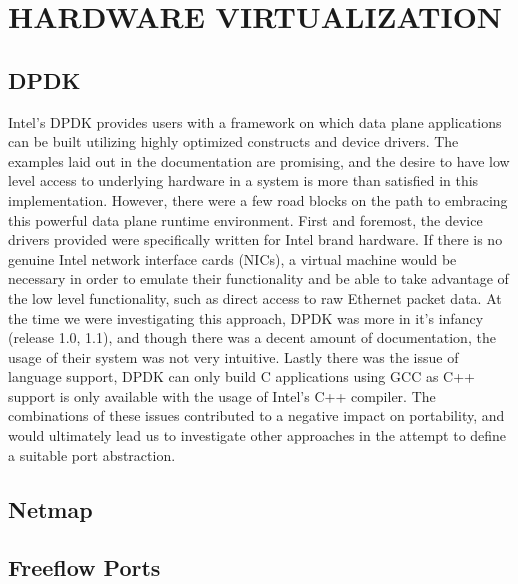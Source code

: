 \chapter{HARDWARE VIRTUALIZATION}
\label{hardware}


\section{DPDK}
\label{hardware:dpdk}
Intel's DPDK provides users with a framework on which data plane
applications can be built utilizing highly optimized constructs and
device drivers. The examples laid out in the documentation are
promising, and the desire to have low level access to underlying
hardware in a system is more than satisfied in this implementation.
However, there were a few road blocks on the path to embracing this
powerful data plane runtime environment. First and foremost, the
device drivers provided were specifically written for Intel brand
hardware. If there is no genuine Intel network interface cards
(NICs), a virtual machine would be necessary in order to emulate
their functionality and be able to take advantage of the low level
functionality, such as direct access to raw Ethernet packet data.
At the time we were investigating this approach, DPDK was more in
it's infancy (release 1.0, 1.1), and though there was a decent amount
of documentation, the usage of their system was not very intuitive.
Lastly there was the issue of language support, DPDK can only build
C applications using GCC as C++ support is only available with the
usage of Intel's C++ compiler. The combinations of these issues
contributed to a negative impact on portability, and would ultimately
lead us to investigate other approaches in the attempt to define
a suitable port abstraction.

\section{Netmap}
\label{hardware:netmap}

\section{Freeflow Ports}
\label{hardware:ffports}
